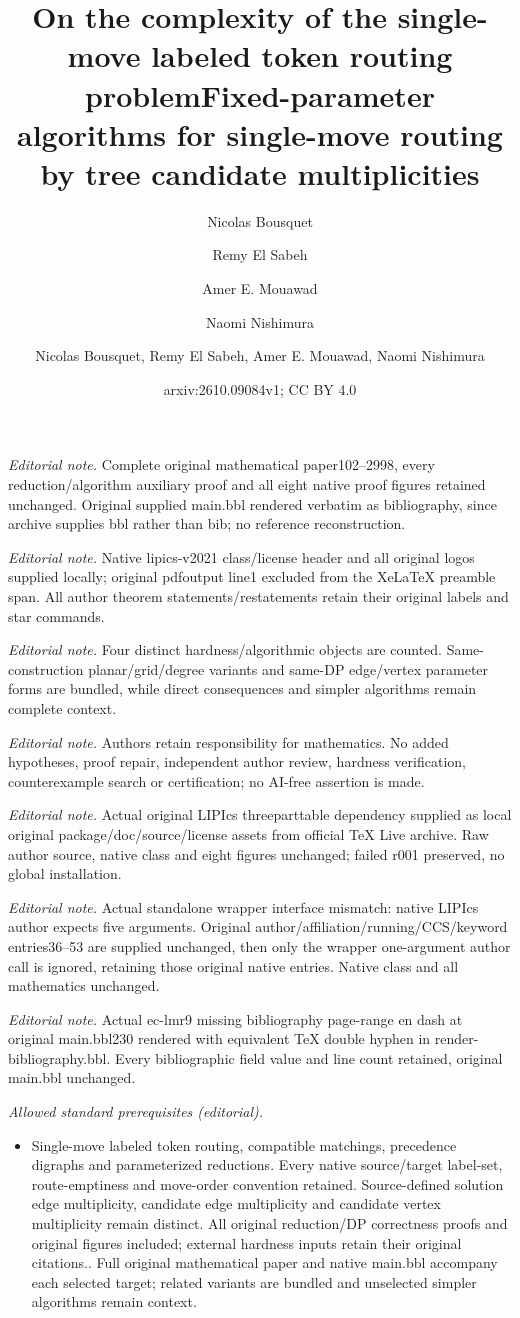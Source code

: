 \documentclass[a4paper,USenglish,thm-restate]{lipics-v2021}
\title{On the complexity of the single-move labeled token routing problem}
\author{Nicolas Bousquet}{CNRS, Univ.\ Lyon, Universit\'e Lyon 1, INSA Lyon, LIRIS UMR CNRS 5205, F-69621 Villeurbanne, France}{nicolas.bousquet@cnrs.fr}{https://orcid.org/0000-0003-0170-0503}{}
\author{Remy {El Sabeh}}{David R. Cheriton School of Computer Science, University of Waterloo, Waterloo, ON, Canada}{relsabeh@uwaterloo.ca}{https://orcid.org/0000-0002-3786-4035}{}
\author{Amer E. Mouawad}{American University of Beirut, Beirut, Lebanon \and David R. Cheriton School of Computer Science, University of Waterloo, Waterloo, ON, Canada}{aa368@aub.edu.lb}{}{}
\author{Naomi Nishimura}{David R. Cheriton School of Computer Science, University of Waterloo, Waterloo, ON, Canada}{nishi@uwaterloo.ca}{}{}
\title{Fixed-parameter algorithms for single-move routing by tree candidate multiplicities}
\author{Nicolas Bousquet, Remy El Sabeh, Amer E. Mouawad, Naomi Nishimura}
\date{arxiv:2610.09084v1; CC BY 4.0}
\theoremstyle{problemstyle}
\begin{document}
\maketitle
\noindent\textit{Editorial note.} Complete original mathematical paper102--2998, every reduction/algorithm auxiliary proof and all eight native proof figures retained unchanged. Original supplied main.bbl rendered verbatim as bibliography, since archive supplies bbl rather than bib; no reference reconstruction.\par\medskip
\noindent\textit{Editorial note.} Native lipics-v2021 class/license header and all original logos supplied locally; original pdfoutput line1 excluded from the XeLaTeX preamble span. All author theorem statements/restatements retain their original labels and star commands.\par\medskip
\noindent\textit{Editorial note.} Four distinct hardness/algorithmic objects are counted. Same-construction planar/grid/degree variants and same-DP edge/vertex parameter forms are bundled, while direct consequences and simpler algorithms remain complete context.\par\medskip
\noindent\textit{Editorial note.} Authors retain responsibility for mathematics. No added hypotheses, proof repair, independent author review, hardness verification, counterexample search or certification; no AI-free assertion is made.\par\medskip
\noindent\textit{Editorial note.} Actual original LIPIcs threeparttable dependency supplied as local original package/doc/source/license assets from official TeX Live archive. Raw author source, native class and eight figures unchanged; failed r001 preserved, no global installation.\par\medskip
\noindent\textit{Editorial note.} Actual standalone wrapper interface mismatch: native LIPIcs author expects five arguments. Original author/affiliation/running/CCS/keyword entries36--53 are supplied unchanged, then only the wrapper one-argument author call is ignored, retaining those original native entries. Native class and all mathematics unchanged.\par\medskip
\noindent\textit{Editorial note.} Actual ec-lmr9 missing bibliography page-range en dash at original main.bbl230 rendered with equivalent TeX double hyphen in render-bibliography.bbl. Every bibliographic field value and line count retained, original main.bbl unchanged.\par\medskip
\noindent\textit{Allowed standard prerequisites (editorial).}\begin{itemize}
\item Single-move labeled token routing, compatible matchings, precedence digraphs and parameterized reductions. Every native source/target label-set, route-emptiness and move-order convention retained. Source-defined solution edge multiplicity, candidate edge multiplicity and candidate vertex multiplicity remain distinct. All original reduction/DP correctness proofs and original figures included; external hardness inputs retain their original citations.. Full original mathematical paper and native main.bbl accompany each selected target; related variants are bundled and unselected simpler algorithms remain context.
\end{itemize}\medskip
\end{document}
